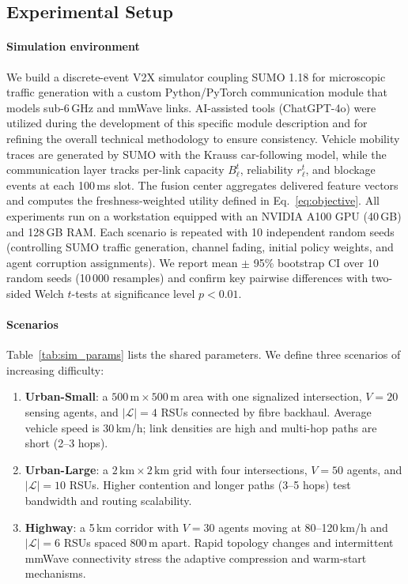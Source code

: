 \documentclass[final,3p,times,review,sort&compress]{elsarticle}
\begin{document}
\subsection{Experimental Setup}
\label{subsec:exp_setup}

\paragraph{Simulation environment}
We build a discrete-event V2X simulator coupling SUMO 1.18 for microscopic traffic generation with a custom Python/PyTorch communication module that models sub-6\,GHz and mmWave links. AI-assisted tools (ChatGPT-4o) were utilized during the development of this specific module description and for refining the overall technical methodology to ensure consistency. Vehicle mobility traces are generated by SUMO with the Krauss car-following model, while the communication layer tracks per-link capacity $B_\ell^t$, reliability $r_\ell^t$, and blockage events at each 100\,ms slot. The fusion center aggregates delivered feature vectors and computes the freshness-weighted utility defined in Eq.~\eqref{eq:objective}. All experiments run on a workstation equipped with an NVIDIA A100 GPU (40\,GB) and 128\,GB RAM. Each scenario is repeated with 10 independent random seeds (controlling SUMO traffic generation, channel fading, initial policy weights, and agent corruption assignments). We report mean $\pm$ 95\% bootstrap CI over 10 random seeds (10\,000 resamples) and confirm key pairwise differences with two-sided Welch $t$-tests at significance level $p<0.01$.

\paragraph{Scenarios}
Table~\ref{tab:sim_params} lists the shared parameters. We define three scenarios of increasing difficulty:

\begin{enumerate}
\item \textbf{Urban-Small}: a $500\,\text{m}\times500\,\text{m}$ area with one signalized intersection, $V{=}20$ sensing agents, and $|\mathcal{L}|{=}4$ RSUs connected by fibre backhaul. Average vehicle speed is 30\,km/h; link densities are high and multi-hop paths are short (2--3 hops).
\item \textbf{Urban-Large}: a $2\,\text{km}\times2\,\text{km}$ grid with four intersections, $V{=}50$ agents, and $|\mathcal{L}|{=}10$ RSUs. Higher contention and longer paths (3--5 hops) test bandwidth and routing scalability.
\item \textbf{Highway}: a 5\,km corridor with $V{=}30$ agents moving at 80--120\,km/h and $|\mathcal{L}|{=}6$ RSUs spaced 800\,m apart. Rapid topology changes and intermittent mmWave connectivity stress the adaptive compression and warm-start mechanisms.
\end{enumerate}
\end{document}
